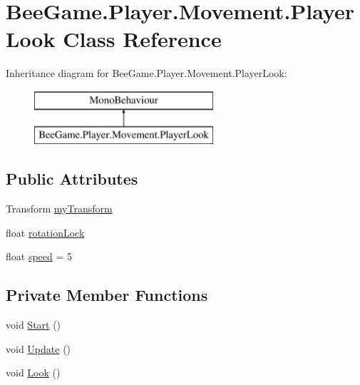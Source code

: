 \hypertarget{class_bee_game_1_1_player_1_1_movement_1_1_player_look}{}\section{Bee\+Game.\+Player.\+Movement.\+Player\+Look Class Reference}
\label{class_bee_game_1_1_player_1_1_movement_1_1_player_look}
Inheritance diagram for Bee\+Game.\+Player.\+Movement.\+Player\+Look\+:\begin{figure}[H]
\begin{center}
\leavevmode
\includegraphics[height=2.000000cm]{class_bee_game_1_1_player_1_1_movement_1_1_player_look}
\end{center}
\end{figure}
\subsection*{Public Attributes}
\begin{DoxyCompactItemize}
\item 
Transform \hyperlink{class_bee_game_1_1_player_1_1_movement_1_1_player_look_a1b69a0e4304df8fa02e0de3e01b6496b}{my\+Transform}
\item 
float \hyperlink{class_bee_game_1_1_player_1_1_movement_1_1_player_look_a3f8df80729aadaeec0471cf881ff608b}{rotation\+Lock}
\item 
float \hyperlink{class_bee_game_1_1_player_1_1_movement_1_1_player_look_ac3a467fcbf2ab53ee216168c51a1349e}{speed} = 5
\end{DoxyCompactItemize}
\subsection*{Private Member Functions}
\begin{DoxyCompactItemize}
\item 
void \hyperlink{class_bee_game_1_1_player_1_1_movement_1_1_player_look_aab0cc79656034e470e212ef2250837f8}{Start} ()
\item 
void \hyperlink{class_bee_game_1_1_player_1_1_movement_1_1_player_look_a6c3528a5b241f1169b8c5584401bbed2}{Update} ()
\item 
void \hyperlink{class_bee_game_1_1_player_1_1_movement_1_1_player_look_a7ff4392d11c1a3c25b80a207de1b5536}{Look} ()
\end{DoxyCompactItemize}
